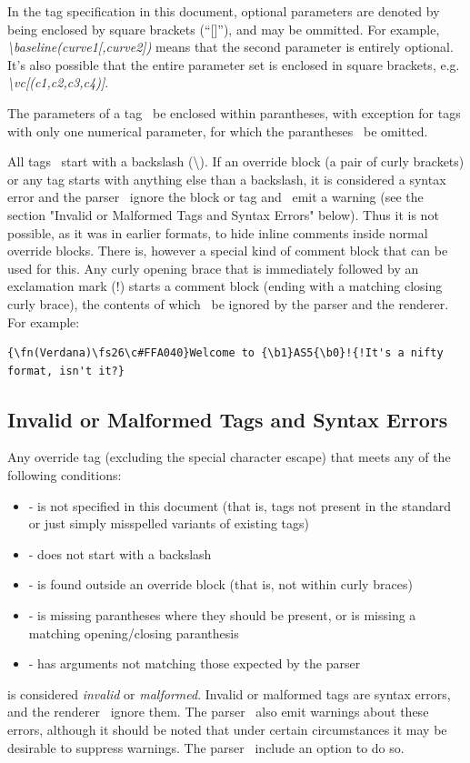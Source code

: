 \documentclass{spec}
\begin{document}
In the tag specification in this document, optional parameters are denoted by being enclosed by square
brackets (``[]''), and may be ommitted. For example, \emph{\textbackslash baseline(curve1[,curve2])}
means that the second parameter is entirely optional. It's also possible that the entire parameter set
is enclosed in square brackets, e.g. \emph{\textbackslash vc[(c1,c2,c3,c4)]}.

The parameters of a tag \must\ be enclosed within parantheses, with exception for tags with only one numerical
parameter, for which the parantheses \may\ be omitted.

All tags \must\ start with a backslash (\textbackslash ). If an override block (a pair of curly brackets)
or any tag starts with anything else than a backslash, it is considered a syntax error and the parser \must\
ignore the block or tag and \should\ emit a warning (see the section "Invalid or Malformed Tags and Syntax Errors"
below). Thus it is not possible, as it was in earlier formats, to hide inline comments inside normal override blocks.
There is, however a special kind of comment block that can be used for this. Any curly opening brace that is
immediately followed by an exclamation mark (!) starts a comment block (ending with a matching closing curly brace),
the contents of which \must\ be ignored by the parser and the renderer.
For example:

\begin{verbatim}
{\fn(Verdana)\fs26\c#FFA040}Welcome to {\b1}AS5{\b0}!{!It's a nifty format, isn't it?}
\end{verbatim}


\subsection{Invalid or Malformed Tags and Syntax Errors}
Any override tag (excluding the special character escape) that meets any of the following conditions:
\begin{itemize}
\item - is not specified in this document (that is, tags not present in the standard or just simply
misspelled variants of existing tags)
\item - does not start with a backslash
\item - is found outside an override block (that is, not within curly braces)
\item - is missing parantheses where they should be present, or is missing a matching opening/closing paranthesis
\item - has arguments not matching those expected by the parser
\end{itemize}
is considered \emph{invalid} or \emph{malformed}. Invalid or malformed tags are syntax errors, and the renderer
\must\ ignore them. The parser \should\ also emit warnings about these errors, although it should be noted that
under certain circumstances it may be desirable to suppress warnings. The parser \should\ include an option to do so.
\end{document}
